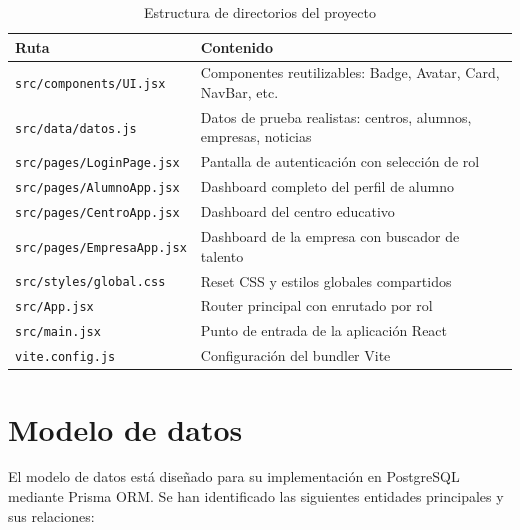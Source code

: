 \documentclass[12pt, a4paper]{report}
\begin{document}
\vspace{0.5em}
\begin{table}[H]
  \centering
  \caption{Estructura de directorios del proyecto}
  \begin{tabularx}{\textwidth}{lX}
    \toprule
    \textbf{Ruta} & \textbf{Contenido} \\
    \midrule
    \texttt{src/components/UI.jsx}   & Componentes reutilizables: Badge, Avatar, Card, NavBar, etc. \\
    \texttt{src/data/datos.js}       & Datos de prueba realistas: centros, alumnos, empresas, noticias \\
    \texttt{src/pages/LoginPage.jsx} & Pantalla de autenticación con selección de rol \\
    \texttt{src/pages/AlumnoApp.jsx} & Dashboard completo del perfil de alumno \\
    \texttt{src/pages/CentroApp.jsx} & Dashboard del centro educativo \\
    \texttt{src/pages/EmpresaApp.jsx}& Dashboard de la empresa con buscador de talento \\
    \texttt{src/styles/global.css}   & Reset CSS y estilos globales compartidos \\
    \texttt{src/App.jsx}             & Router principal con enrutado por rol \\
    \texttt{src/main.jsx}            & Punto de entrada de la aplicación React \\
    \texttt{vite.config.js}          & Configuración del bundler Vite \\
    \bottomrule
  \end{tabularx}
\end{table}

\section{Modelo de datos}

El modelo de datos está diseñado para su implementación en PostgreSQL mediante Prisma ORM. Se han
identificado las siguientes entidades principales y sus relaciones:
\end{document}
